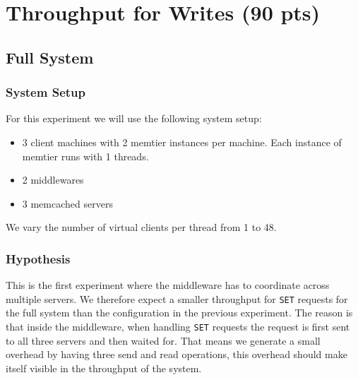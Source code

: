 \documentclass[11pt,a4paper]{article}
\begin{document}
%
\section{Throughput for Writes (90 pts)}\label{sec:tp_write}
%
\subsection{Full System}
%
\subsubsection{System Setup}
%
For this experiment we will use the following system setup:
%
\begin{itemize}
	\item 3 client machines with 2 memtier instances per machine. Each instance of memtier runs with 1 threads.
	\item 2 middlewares
	\item 3 memcached servers
\end{itemize}
%
We vary the number of virtual clients per thread from 1 to 48.
%
\subsubsection{Hypothesis}
%
This is the first experiment where the middleware has to coordinate across multiple servers.
%
We therefore expect a smaller throughput for \texttt{SET} requests for the full system than the configuration in the previous experiment.
%
The reason is that inside the middleware, when handling \texttt{SET} requests the request is first sent to all three servers and then waited for.
%
That means we generate a small overhead by having three send and read operations, this overhead should make itself visible in the throughput of the system.
%
\end{document}

